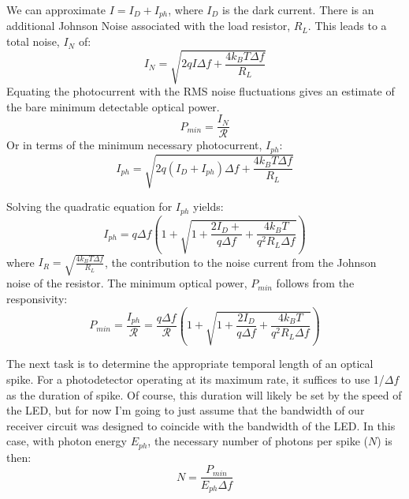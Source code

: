 \documentclass[twocolumn]{article}
\begin{document}
We can approximate $I = I_{D} + I_{ph}$, where $I_{D}$ is the dark current. There is an additional Johnson Noise associated with the load resistor, $R_{L}$. This leads to a total noise, $I_{N}$ of:
\begin{equation}
    I_{N} = \sqrt{2qI\Delta f + \frac{4k_{B}T\Delta f}{R_{L}}}
\end{equation}
Equating the photocurrent with the RMS noise fluctuations gives an estimate of the bare minimum detectable optical power.
\begin{equation}
    P_{min} = \frac{I_N}{\mathcal{R}}
\end{equation}
Or in terms of the minimum necessary photocurrent, $I_{ph}$:
\begin{equation}
    I_{ph} = \sqrt{2q(I_D+I_{ph})\Delta f + \frac{4k_{B}T\Delta f}{R_{L}}
    }
\end{equation}

Solving the quadratic equation for $I_{ph}$ yields:
\begin{equation}
    I_{ph} = q\Delta f(1+\sqrt{1+\frac{2I_D+}{q\Delta f} +
    \frac{4k_BT}{q^2R_L\Delta f}})
\end{equation}
where $I_R = \sqrt{\frac{4k_{B}T\Delta f}{R_{L}}}$, the contribution to the noise current from the Johnson noise of the resistor. The minimum optical power, $P_{min}$ follows from the responsivity:
\begin{equation}
    P_{min} = \frac{I_{ph}}{\mathcal{R}}=
    \frac{q\Delta f}{\mathcal{R}}(1+\sqrt{1+\frac{2I_D}{q\Delta f} +
    \frac{4k_BT}{q^2R_L\Delta f}})
\end{equation}

The next task is to determine the appropriate temporal length of an optical spike. For a photodetector operating at its maximum rate, it suffices to use 1/$\Delta f$ as the duration of spike. Of course, this duration will likely be set by the speed of the LED, but for now I'm going to just assume that the bandwidth of our receiver circuit was designed to coincide with the bandwidth of the LED. In this case, with photon energy $E_{ph}$, the necessary number of photons per spike ($N$) is then:
\begin{equation}
    N = \frac{P_{min}}{E_{ph}\Delta f}
\end{equation}
\end{document}
